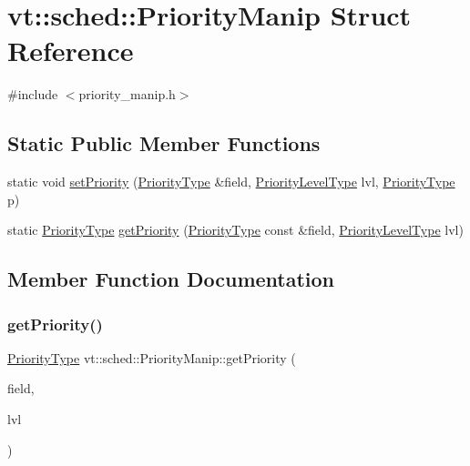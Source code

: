 \hypertarget{structvt_1_1sched_1_1_priority_manip}{}\section{vt\+:\+:sched\+:\+:Priority\+Manip Struct Reference}
\label{structvt_1_1sched_1_1_priority_manip}


{\ttfamily \#include $<$priority\+\_\+manip.\+h$>$}

\subsection*{Static Public Member Functions}
\begin{DoxyCompactItemize}
\item 
static void \hyperlink{structvt_1_1sched_1_1_priority_manip_a1e3fd14daa6da7902a621d7e175b0d76}{set\+Priority} (\hyperlink{namespacevt_a86bff9f556eb761b27fc8600d006ac04}{Priority\+Type} \&field, \hyperlink{namespacevt_a53e07fdb3351b0f263e0dfd51b968d5e}{Priority\+Level\+Type} lvl, \hyperlink{namespacevt_a86bff9f556eb761b27fc8600d006ac04}{Priority\+Type} p)
\item 
static \hyperlink{namespacevt_a86bff9f556eb761b27fc8600d006ac04}{Priority\+Type} \hyperlink{structvt_1_1sched_1_1_priority_manip_a078ab0d05954a2718203af1684b4e360}{get\+Priority} (\hyperlink{namespacevt_a86bff9f556eb761b27fc8600d006ac04}{Priority\+Type} const \&field, \hyperlink{namespacevt_a53e07fdb3351b0f263e0dfd51b968d5e}{Priority\+Level\+Type} lvl)
\end{DoxyCompactItemize}


\subsection{Member Function Documentation}
\mbox{\label{structvt_1_1sched_1_1_priority_manip_a078ab0d05954a2718203af1684b4e360}} 
\subsubsection{\texorpdfstring{get\+Priority()}{getPriority()}}
{\footnotesize\ttfamily \hyperlink{namespacevt_a86bff9f556eb761b27fc8600d006ac04}{Priority\+Type} vt\+::sched\+::\+Priority\+Manip\+::get\+Priority (\begin{DoxyParamCaption}\item[{\hyperlink{namespacevt_a86bff9f556eb761b27fc8600d006ac04}{Priority\+Type} const \&}]{field,  }\item[{\hyperlink{namespacevt_a53e07fdb3351b0f263e0dfd51b968d5e}{Priority\+Level\+Type}}]{lvl }\end{DoxyParamCaption})\hspace{0.3cm}{\ttfamily [static]}}

